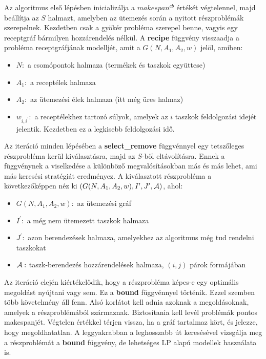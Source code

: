 Az algoritmus első lépésben inicializálja a $makespan^{cb}$ értékét végtelennel, majd beállítja az $S$ halmazt, amelyben az ütemezés során a nyitott részproblémák szerepelnek. Kezdetben csak a gyökér probléma szerepel benne, vagyis egy receptgráf bármilyen hozzárendelés nélkül. A \textbf{recipe} függvény visszaadja a probléma receptgráfjának modelljét, amit a $G(N,A_1,A_2,w)$ jelöl, amiben:
\begin{itemize}
	\item $N:$ a csomópontok halmaza (termékek és taszkok együttese)
	\item $A_{1}:$ a receptélek halmaza
	\item $A_{2}:$ az ütemezési élek halmaza (itt még üres halmaz)
	\item $w_{i,i^{'}}:$ a receptélekhez tartozó súlyok, amelyek az $i$ taszkok feldolgozási idejét jelentik. Kezdetben ez a legkisebb feldolgozási idő.
\end{itemize}

Az iteráció minden lépésében a \textbf{select\_remove} függvénnyel egy tetszőleges részprobléma kerül kiválasztásra, majd az $S$-ből eltávolításra. Ennek a függvénynek a viselkedése a különböző megvalósításokban más és más lehet, ami más keresési stratégiát eredményez. A kiválasztott részprobléma a következőképpen néz ki $(G(N,A_1,A_2,w),I',J',{\cal A})$, ahol:
\begin{itemize}
	\item $G(N,A_{1},A_{2},w):$ az ütemezési gráf
	\item $I^{'}:$ a még nem ütemezett taszkok halmaza
	\item $J^{'}:$ azon berendezések halmaza, amelyekhez az algoritmus még tud rendelni taszkokat 
	\item $\cal{A}:$ taszk-berendezés hozzárendelések halmaza, $(i,j)$ párok formájában 
\end{itemize}

Az iteráció elején kiértékelődik, hogy a részprobléma képes-e egy optimális megoldást nyújtani vagy sem. Ez a \textbf{bound} függvénnyel történik. Ezzel szemben több követelmény áll fenn. Alsó korlátot kell adnia azoknak a megoldásoknak, amelyek a részproblémából származnak. Biztosítania kell levél problémák pontos makespanjét. Végtelen értékkel térjen vissza, ha a gráf tartalmaz kört, és jelezze, hogy megoldhatatlan. A leggyakrabban a leghosszabb út keresésével vizsgálja meg a részproblémát a \textbf{bound} függvény, de lehetséges LP alapú modellek használata is.

